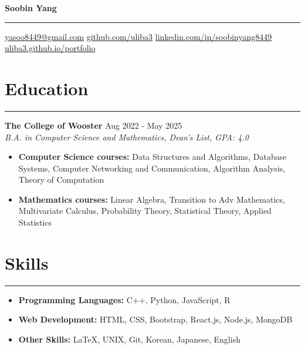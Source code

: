 \documentclass[a4paper,12pt]{article}
\begin{document}
\linespread{1}\selectfont
{}
\newcommand{\sectionrule}[1]{
  \vspace{-15pt}
  \section*{\normalfont #1}
  \vspace{-10pt}
  \hrule
  \vspace{5pt}
}
\pagestyle{empty}

\begin{center}
    \textbf{\LARGE Soobin Yang}
    \hrule
    \vspace{5pt}
    \faEnvelope \hspace{1pt} \href{mailto:yasoo8449@gmail.com}{yasoo8449@gmail.com} \hspace{5pt}
    \faGithubSquare \hspace{1pt} \href{https://github.com/uliba3}{github.com/uliba3} \hspace{5pt}
    \faLinkedinSquare \hspace{1pt} \href{https://linkedin.com/in/soobinyang8449}{linkedin.com/in/soobinyang8449} \\
    \faGlobe \hspace{1pt} \href{https://uliba3.github.io/portfolio/}{uliba3.github.io/portfolio}
\end{center}

\vspace{-20pt}

\sectionrule{Education}
\textbf{\large The College of Wooster} \hfill \textnormal{Aug 2022 - May 2025}\\
\textit{B.A. in Computer Science and Mathematics, Dean's List, GPA: 4.0}
\begin{itemize}
    \item \textbf{Computer Science courses:} Data Structures and Algorithms, Database Systems, Computer Networking and Communication, Algorithm Analysis, Theory of Computation
    \item \textbf{Mathematics courses:} Linear Algebra, Transition to Adv Mathematics, Multivariate Calculus, Probability Theory, Statistical Theory, Applied Statistics
\end{itemize}

\sectionrule{Skills}
\begin{itemize}
    \item \textbf{Programming Languages:} C++, Python, JavaScript, R
    \item \textbf{Web Development:} HTML, CSS, Bootstrap, React.js, Node.js, MongoDB
    \item \textbf{Other Skills:} LaTeX, UNIX, Git, Korean, Japanese, English
\end{itemize}
\end{document}
